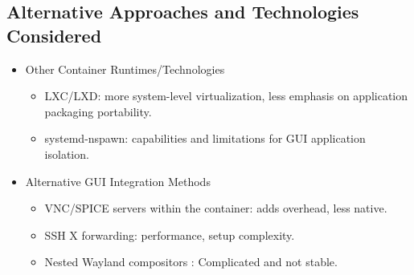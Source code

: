 \documentclass[journal,onecolumn]{IEEEtran}
\begin{document}
\subsection{Alternative Approaches and Technologies Considered}
\begin{itemize}
    \item Other Container Runtimes/Technologies
    \begin{itemize}
        \item LXC/LXD: more system-level virtualization, less emphasis on application packaging portability.
        \item systemd-nspawn: capabilities and limitations for GUI application isolation.
    \end{itemize}
    \item Alternative GUI Integration Methods
    \begin{itemize}
        \item VNC/SPICE servers within the container: adds overhead, less native.
        \item SSH X forwarding: performance, setup complexity.
        \item Nested Wayland compositors : Complicated and not stable.
    \end{itemize}
\end{itemize}
\end{document}
